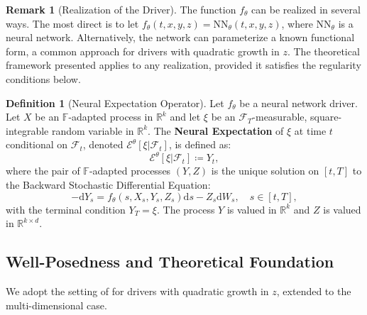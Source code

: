 \documentclass[qian]{imsart}
\newcommand{\R}{\mathbb{R}}
\newcommand{\Fcal}{\mathcal{F}}
\newcommand{\cEneutheta}{\mathcal{E}^{\theta}}
\newcommand{\dd}{\mathrm{d}}
\theoremstyle{plain}
\theoremstyle{definition}
\newtheorem{definition}[theorem]{Definition}
\newtheorem{remark}[theorem]{Remark}
\begin{document}
\begin{remark}[Realization of the Driver]
The function $f_\theta$ can be realized in several ways. The most direct is to let $f_\theta(t,x,y,z) = \text{NN}_\theta(t,x,y,z)$, where $\text{NN}_\theta$ is a neural network. Alternatively, the network can parameterize a known functional form, a common approach for drivers with quadratic growth in $z$. The theoretical framework presented applies to any realization, provided it satisfies the regularity conditions below.
\end{remark}

\begin{definition}[Neural Expectation Operator]
\label{def:neural_expectation}
Let $f_\theta$ be a neural network driver. Let $X$ be an $\mathbb{F}$-adapted process in $\R^k$ and let $\xi$ be an $\Fcal_T$-measurable, square-integrable random variable in $\R^k$. The \textbf{Neural Expectation} of $\xi$ at time $t$ conditional on $\Fcal_t$, denoted $\cEneutheta[\xi | \Fcal_t]$, is defined as:
\[ \cEneutheta[\xi | \Fcal_t] \coloneqq Y_t, \]
where the pair of $\mathbb{F}$-adapted processes $(Y,Z)$ is the unique solution on $[t,T]$ to the Backward Stochastic Differential Equation:
\begin{equation} \label{eq:bsde_def_revised}
    -\dd Y_s = f_\theta(s, X_s, Y_s, Z_s) \dd s - Z_s \dd W_s, \quad s \in [t,T],
\end{equation}
with the terminal condition $Y_T = \xi$. The process $Y$ is valued in $\R^k$ and $Z$ is valued in $\R^{k \times d}$.
\end{definition}

\subsection{Well-Posedness and Theoretical Foundation}

We adopt the setting of \cite{Kobylanski2000} for drivers with quadratic growth in $z$, extended to the multi-dimensional case.
\end{document}
